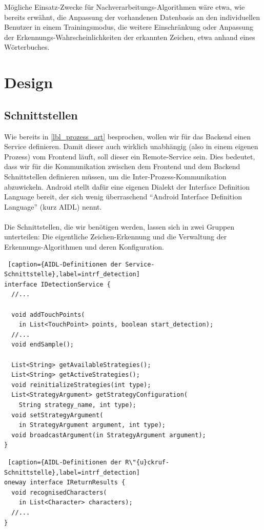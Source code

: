 Mögliche Einsatz-Zwecke für Nachverarbeitungs-Algorithmen wäre etwa, wie bereits erwähnt, die Anpassung der vorhandenen Datenbasis an den individuellen Benutzer in einem Trainingsmodus, die weitere Einschränkung oder Anpassung der Erkennungs-Wahrscheinlichkeiten der erkannten Zeichen, etwa anhand eines Wörterbuches.

\section{Design}

\subsection{Schnittstellen}\label{lbl_be_intrf}

Wie bereits in \ref{lbl_prozess_art} besprochen, wollen wir für das Backend einen Service definieren. Damit dieser auch wirklich unabhängig (also in einem eigenen Prozess) vom Frontend läuft, soll dieser ein Remote-Service sein. Dies bedeutet, dass wir für die Kommunikation zwischen dem Frontend und dem Backend Schnittstellen definieren müssen, um die Inter-Prozess-Kommunikation abzuwickeln. Android stellt dafür eine eigenen Dialekt der Interface Definition Language bereit, der sich wenig überraschend ``Android Interface Definition Language'' (kurz AIDL) nennt.\\
\\
Die Schnittstellen, die wir benötigen werden, lassen sich in zwei Gruppen unterteilen: Die eigentliche Zeichen-Erkennung und die Verwaltung der Erkennungs-Algorithmen und deren Konfiguration.\\

\begin{lstlisting} [caption={AIDL-Definitionen der Service-Schnittstelle},label=intrf_detection]
interface IDetectionService {
  //...

  void addTouchPoints(
    in List<TouchPoint> points, boolean start_detection);
  //...
  void endSample();

  List<String> getAvailableStrategies();
  List<String> getActiveStrategies();
  void reinitializeStrategies(int type);
  List<StrategyArgument> getStrategyConfiguration(
    String strategy_name, int type);
  void setStrategyArgument(
    in StrategyArgument argument, int type);
  void broadcastArgument(in StrategyArgument argument);
}
\end{lstlisting}
\newpage
\begin{lstlisting} [caption={AIDL-Definitionen der R\"{u}ckruf-Schnittstelle},label=intrf_detection]
oneway interface IReturnResults {
  void recognisedCharacters(
    in List<Character> characters);
  //...
}
\end{lstlisting}

